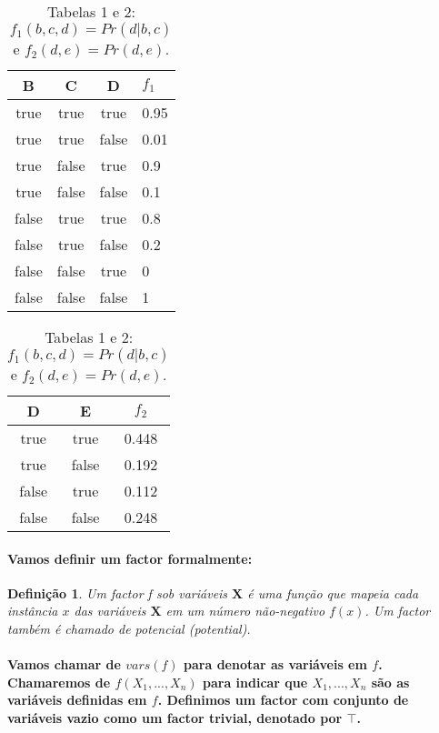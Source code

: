 \documentclass[a4paper,10pt]{article}
\theoremstyle{plain}
\newtheorem*{spn-def}{Definição}
\begin{document}
\begin{table}[h]
\begin{center}
\captionsetup{justification=centering}
\begin{tabular}{*{3}{c} | l}
  B & C & D & $f_1$ \\
  \hline
  true & true & true & 0.95 \\
  true & true & false & 0.01 \\
  true & false & true & 0.9 \\
  true & false & false & 0.1 \\
  false & true & true & 0.8 \\
  false & true & false & 0.2 \\
  false & false & true & 0 \\
  false & false & false & 1 \\
\end{tabular}
\quad
\quad
\begin{tabular}{*{2}{c} | c}
  D & E & $f_2$ \\
  \hline
  true & true & 0.448 \\
  true & false & 0.192 \\
  false & true & 0.112 \\
  false & false & 0.248 \\
\end{tabular}
\caption*{Tabelas 1 e 2: $f_1(b, c, d) = Pr(d | b, c)$ e $f_2(d, e) = Pr(d, e)$.}
\end{center}
\end{table}
\setcounter{table}{2}

\paragraph{
 Vamos definir um factor formalmente: 
}

\begin{spn-def} Um \textit{factor} f sob variáveis $\textbf{X}$ é uma função que mapeia cada 
  instância $x$ das variáveis $\textbf{X}$ em um número não-negativo $f(x)$. Um factor também é
  chamado de potencial (\textit{potential}).
\end{spn-def}

\paragraph{
  Vamos chamar de $vars(f)$ para denotar as variáveis em $f$. Chamaremos de $f(X_1,...,X_n)$ para
indicar que $X_1,...,X_n$ são as variáveis definidas em $f$. Definimos um factor com conjunto
de variáveis vazio como um factor trivial, denotado por $\top$.
}
\end{document}
